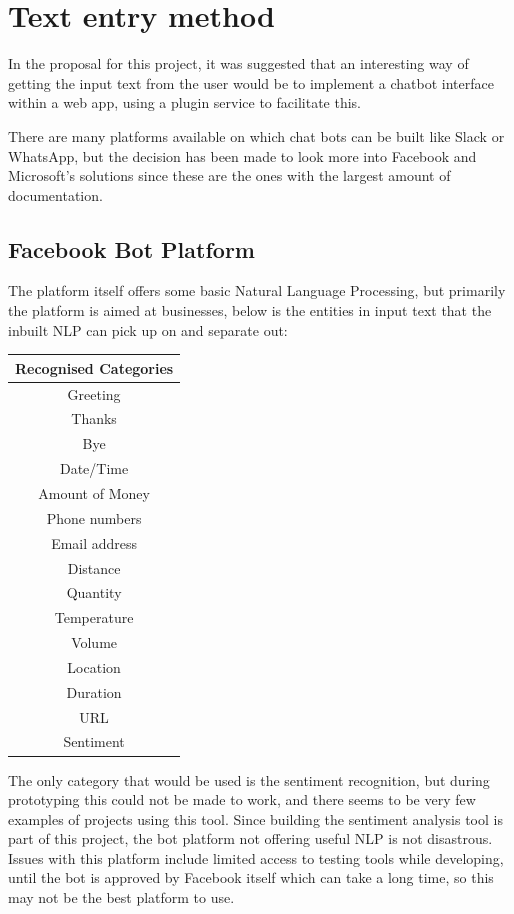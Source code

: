 

\section{Text entry method}

In the proposal for this project, it was suggested that an interesting way of getting the input text from the user would be to implement a chatbot interface within a web app, using a plugin service to facilitate this. 

There are many platforms available on which chat bots can be built like Slack or WhatsApp, but the decision has been made to look more into Facebook and Microsoft's solutions since these are the ones with the largest amount of documentation.

\subsection{Facebook Bot Platform}

The platform itself offers some basic Natural Language Processing, but primarily the platform is aimed at businesses, below is the entities in input text that the inbuilt NLP can pick up on and separate out:

\begin{center}
\begin{tabular}{ |c| } 
 \hline
  Recognised Categories \\ 
 \hline                        
 Greeting \\
 Thanks \\
 Bye \\
 Date/Time \\
 Amount of Money \\
 Phone numbers \\
 Email address \\
 Distance \\
 Quantity \\
 Temperature \\
 Volume \\
 Location \\
 Duration \\
 URL \\
 Sentiment \\
 \hline
\end{tabular}
\end{center}

The only category that would be used is the sentiment recognition, but during prototyping this could not be made to work, and there seems to be very few examples of projects using this tool.
Since building the sentiment analysis tool is part of this project, the bot platform not offering useful NLP is not disastrous. 
Issues with this platform include limited access to testing tools while developing, until the bot is approved by Facebook itself which can take a long time, so this may not be the best platform to use. 

